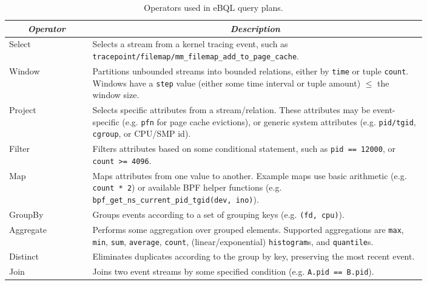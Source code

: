 \begin{table}[htpb]
    \centering
    \caption{Operators used in eBQL query plans.}
    \label{tab:ebql-ops}
    \begin{tabular}{|l|p{0.8\linewidth}|}
        \hline
        \multicolumn{1}{|c|}{\textit{\textbf{Operator}}} &
        \multicolumn{1}{c|}{\textit{\textbf{Description}}}
        \tabularnewline \hline
        Select & Selects a stream from a kernel tracing event, such as
        \texttt{tracepoint/filemap/mm\_filemap\_add\_to\_page\_cache}. \\
        \hline
        Window & Partitions unbounded streams into bounded relations, either by \texttt{time} or
        tuple \texttt{count}. Windows have a \texttt{step} value (either some time interval or
        tuple amount) $\le $ the window size.\\
        \hline
        Project & Selects specific attributes from a stream/relation. These attributes may be
        event-specific (e.g. \texttt{pfn} for page cache evictions), or generic system attributes
        (e.g. \texttt{pid/tgid}, \texttt{cgroup}, or CPU/SMP id).\\
        \hline
        Filter & Filters attributes based on some conditional statement, such as \texttt{pid ==
        12000}, or \texttt{count >= 4096}. \\
        \hline
        Map & Maps attributes from one value to another. Example maps use basic arithmetic (e.g.
        \texttt{count * 2}) or available BPF helper functions (e.g.
        \texttt{bpf\_get\_ns\_current\_pid\_tgid(dev, ino)}). \\
        \hline
        GroupBy & Groups events according to a set of grouping keys (e.g. \texttt{(fd, cpu)}).\\
        \hline
        Aggregate & Performs some aggregation over grouped elements. Supported aggregations are
        \texttt{max}, \texttt{min}, \texttt{sum}, \texttt{average}, \texttt{count},
        (linear/exponential) \texttt{histogram}s, and \texttt{quantile}s. \\
        \hline
        Distinct & Eliminates duplicates according to the group by key, preserving the most recent
        event. \\
        \hline
        Join & Joins two event streams by some specified condition (e.g. \texttt{A.pid == B.pid}).\\
        \hline
    \end{tabular}
\end{table}

